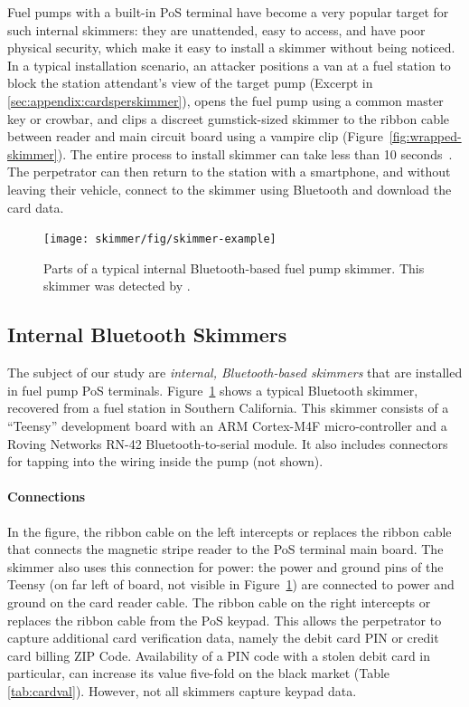 Fuel pumps
with a built-in PoS terminal have become a very popular target for such internal skimmers: they are unattended, easy
to access, and have poor physical security, which make it easy to install a skimmer without being noticed.
%
In a typical installation scenario, an attacker positions a van at a fuel station to block the station attendant's view of
the target pump (Excerpt in \ref{sec:appendix:cardsperskimmer}), opens the fuel pump using a common master key or crowbar, and clips a discreet gumstick-sized skimmer to the
ribbon cable between reader and main circuit board using a vampire clip (Figure~\ref{fig:wrapped-skimmer}). 
The entire process to install skimmer can
take less than 10 seconds~\cite{arizonareport}. The perpetrator can then return to the station with a 
smartphone, and without leaving their vehicle, connect to the skimmer using Bluetooth and download the card data.

\begin{figure}
    \centering
    \texttt{[image: skimmer/fig/skimmer-example]}
    \caption{Parts of a typical internal Bluetooth-based fuel pump skimmer. This skimmer
    was detected by \bluetana.}
    \label{fig:skimmer-example}
\end{figure}

\subsection{Internal Bluetooth Skimmers}
\label{sec:bkgd-skimhw}

The subject of our study are \emph{internal, Bluetooth-based skimmers} that are installed in fuel pump PoS
terminals. 
%
Figure~\ref{fig:skimmer-example} shows a typical Bluetooth skimmer, recovered from a fuel station in Southern California. This skimmer consists of a ``Teensy'' development board with an ARM Cortex-M4F
micro-controller and a Roving Networks \xspace{RN-42} Bluetooth-to-serial module. It also includes connectors 
for tapping into the wiring inside the pump (not shown). 

\paragraph{Connections} In the figure, the ribbon cable on the left intercepts or replaces the ribbon cable that connects the
magnetic stripe reader to the PoS terminal main board. The skimmer also uses this connection for power: the power and
ground pins of the Teensy (on far left of board, not visible in Figure~\ref{fig:skimmer-example}) are connected to
power and ground on the card reader cable. The ribbon cable on the right intercepts or replaces the ribbon cable from
the PoS keypad. This allows the perpetrator to capture additional card verification data, namely the debit card PIN
or credit card billing ZIP Code. Availability of a PIN code with a stolen debit card in particular, can increase its
value five-fold on the black market (Table \ref{tab:cardval}). However, not all skimmers capture keypad data.

